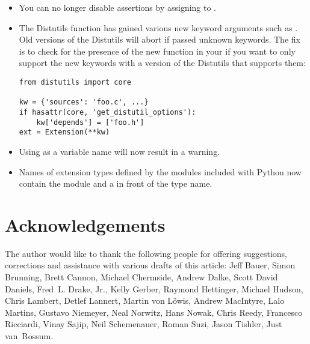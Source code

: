 \documentclass{howto}
\begin{document}
\begin{itemize}
\item You can no longer disable assertions by assigning to .

\item The Distutils  function has gained various new
keyword arguments such as .  Old versions of the
Distutils will abort if passed unknown keywords.  The fix is to check
for the presence of the new  function
in your  if you want to only support the new keywords
with a version of the Distutils that supports them:

\begin{verbatim}
from distutils import core

kw = {'sources': 'foo.c', ...}
if hasattr(core, 'get_distutil_options'):
    kw['depends'] = ['foo.h']
ext = Extension(**kw)
\end{verbatim}

\item Using  as a variable name will now result in a
 warning.

\item Names of extension types defined by the modules included with
Python now contain the module and a  in front of the type
name.

\end{itemize}


\section{Acknowledgements \label{acks}}

The author would like to thank the following people for offering
suggestions, corrections and assistance with various drafts of this
article: Jeff Bauer, Simon Brunning, Brett Cannon, Michael Chermside,
Andrew Dalke, Scott David Daniels, Fred~L. Drake, Jr., Kelly Gerber,
Raymond Hettinger, Michael Hudson, Chris Lambert, Detlef Lannert,
Martin von L\"owis, Andrew MacIntyre, Lalo Martins, Gustavo Niemeyer,
Neal Norwitz, Hans Nowak, Chris Reedy, Francesco Ricciardi, 
Vinay Sajip, Neil Schemenauer,
Roman Suzi, Jason Tishler, Just van~Rossum.
\end{document}
